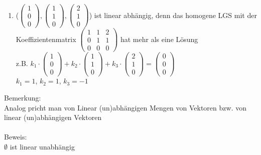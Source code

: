 \documentclass{scrartcl}
\begin{document}
\begin{enumerate}
		\item ($\begin{pmatrix}
			1 \\ 0 \\ 0
		\end{pmatrix}, \begin{pmatrix}
			1 \\ 1 \\ 0
		\end{pmatrix}, \begin{pmatrix}
			2 \\ 1 \\ 0
		\end{pmatrix}$) ist linear abhängig, denn das homogene LGS mit der Koeffizientenmatrix $\begin{pmatrix}
			1 & 1 & 2 \\ 0 & 1 & 1 \\ 0 & 0 & 0
		\end{pmatrix}$ hat mehr als eine Lösung\\ z.B. $k_1\cdot \begin{pmatrix}
			1 \\ 0 \\ 0
		\end{pmatrix} + k_2 \cdot \begin{pmatrix}
			1 \\ 1 \\ 0
		\end{pmatrix} + k_3 \cdot \begin{pmatrix}
			2 \\ 1 \\ 0
		\end{pmatrix} = \begin{pmatrix}
			0 \\ 0 \\ 0
		\end{pmatrix}$\\
		$k_1 = 1$, $k_2 = 1$, $k_3 = -1$
	\end{enumerate}	
	Bemerkung:\\
	Analog pricht man von Linear (un)abhängigen Mengen von Vektoren bzw. von linear (un)abhängigen Vektoren \\ \\
	Beweis:\\
	$\emptyset$ ist linear unabhängig
		
\end{document}
